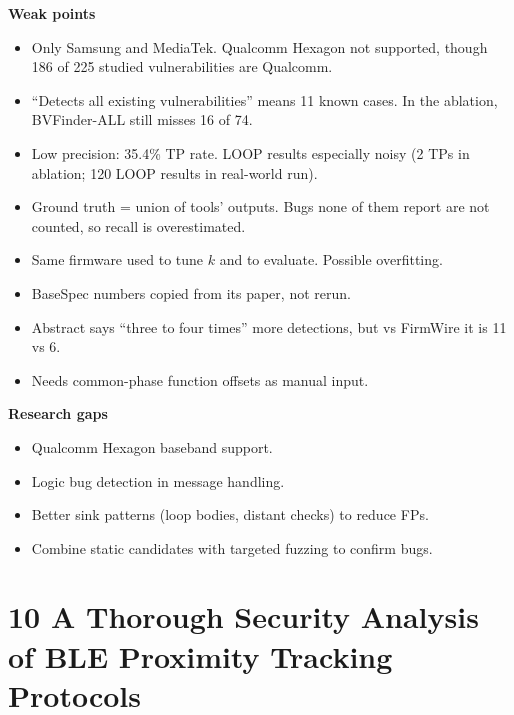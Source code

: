 \documentclass[11pt,a4paper]{article}
\begin{document}
\begin{enumerate}
    \vspace{4pt}
    \textbf{Weak points}
    \begin{itemize}
        \item Only Samsung and MediaTek. Qualcomm Hexagon not supported, though 186 of 225 studied vulnerabilities are Qualcomm.
        \item ``Detects all existing vulnerabilities'' means 11 known cases. In the ablation, BVFinder-ALL still misses 16 of 74.
        \item Low precision: 35.4\% TP rate. LOOP results especially noisy (2 TPs in ablation; 120 LOOP results in real-world run).
        \item Ground truth = union of tools' outputs. Bugs none of them report are not counted, so recall is overestimated.
        \item Same firmware used to tune $k$ and to evaluate. Possible overfitting.
        \item BaseSpec numbers copied from its paper, not rerun.
        \item Abstract says ``three to four times'' more detections, but vs FirmWire it is 11 vs 6.
        \item Needs common-phase function offsets as manual input.
    \end{itemize}

    \vspace{4pt}
    \textbf{Research gaps}
    \begin{itemize}
        \item Qualcomm Hexagon baseband support.
        \item Logic bug detection in message handling.
        \item Better sink patterns (loop bodies, distant checks) to reduce FPs.
        \item Combine static candidates with targeted fuzzing to confirm bugs.
    \end{itemize}

\end{enumerate}

\newpage

\section{10 A Thorough Security Analysis of BLE Proximity Tracking Protocols}
\end{document}
